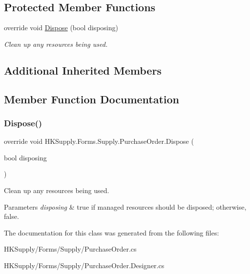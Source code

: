\subsection*{Protected Member Functions}
\begin{DoxyCompactItemize}
\item 
override void \mbox{\hyperlink{class_h_k_supply_1_1_forms_1_1_supply_1_1_purchase_order_af6011dd3093ad12fee6ce29498e77fb3}{Dispose}} (bool disposing)
\begin{DoxyCompactList}\small\item\em Clean up any resources being used. \end{DoxyCompactList}\end{DoxyCompactItemize}
\subsection*{Additional Inherited Members}


\subsection{Member Function Documentation}
\mbox{\label{class_h_k_supply_1_1_forms_1_1_supply_1_1_purchase_order_af6011dd3093ad12fee6ce29498e77fb3}} 
\subsubsection{\texorpdfstring{Dispose()}{Dispose()}}
{\footnotesize\ttfamily override void H\+K\+Supply.\+Forms.\+Supply.\+Purchase\+Order.\+Dispose (\begin{DoxyParamCaption}\item[{bool}]{disposing }\end{DoxyParamCaption})\hspace{0.3cm}{\ttfamily [protected]}}



Clean up any resources being used. 


\begin{DoxyParams}{Parameters}
{\em disposing} & true if managed resources should be disposed; otherwise, false.\\
\hline
\end{DoxyParams}


The documentation for this class was generated from the following files\+:\begin{DoxyCompactItemize}
\item 
H\+K\+Supply/\+Forms/\+Supply/Purchase\+Order.\+cs\item 
H\+K\+Supply/\+Forms/\+Supply/Purchase\+Order.\+Designer.\+cs\end{DoxyCompactItemize}
